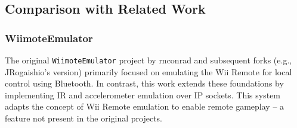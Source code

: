 


\subsection{Comparison with Related Work}

\subsubsection{WiimoteEmulator}
The original \texttt{WiimoteEmulator} project by rnconrad and subsequent forks
(e.g., JRogaishio's version) primarily focused on emulating the Wii Remote for
local control using Bluetooth. In contrast, this work extends these foundations
by implementing IR and accelerometer emulation over IP sockets. This system adapts the concept of
Wii Remote emulation to enable remote gameplay -- a feature not present in the
original projects.

